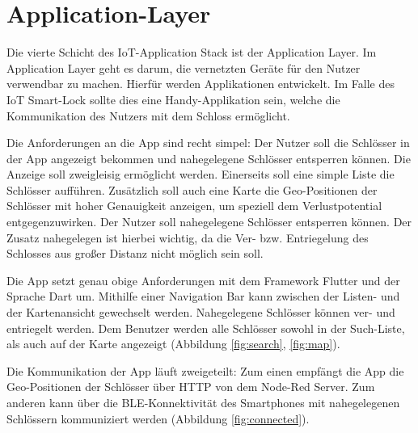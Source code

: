 
\section{Application-Layer}
Die vierte Schicht des \ac{IoT}-Application Stack ist der Application Layer. Im Application Layer geht es darum, die vernetzten Geräte für den Nutzer verwendbar zu machen. Hierfür werden Applikationen entwickelt. Im Falle des \ac{IoT} Smart-Lock sollte dies eine Handy-Applikation sein, welche die Kommunikation des Nutzers mit dem Schloss ermöglicht.

Die Anforderungen an die App sind recht simpel: Der Nutzer soll die Schlösser in der App angezeigt bekommen und nahegelegene Schlösser entsperren können. Die Anzeige soll zweigleisig ermöglicht werden. Einerseits soll eine simple Liste die Schlösser aufführen. Zusätzlich soll auch eine Karte die Geo-Positionen der Schlösser mit hoher Genauigkeit anzeigen, um speziell dem Verlustpotential entgegenzuwirken. Der Nutzer soll nahegelegene Schlösser entsperren können. Der Zusatz nahegelegen ist hierbei wichtig, da die Ver- bzw. Entriegelung des Schlosses aus großer Distanz nicht möglich sein soll.

Die App setzt genau obige Anforderungen mit dem Framework Flutter und der Sprache Dart um. Mithilfe einer Navigation Bar kann zwischen der Listen- und der Kartenansicht gewechselt werden. Nahegelegene Schlösser können ver- und entriegelt werden. Dem Benutzer werden alle Schlösser sowohl in der Such-Liste, als auch auf der Karte angezeigt (Abbildung \ref{fig:search}, \ref{fig:map}).

Die Kommunikation der App läuft zweigeteilt: Zum einen empfängt die App die Geo-Positionen der Schlösser über \ac{HTTP} von dem Node-Red Server. Zum anderen kann über die \ac{BLE}-Konnektivität des Smartphones mit nahegelegenen Schlössern kommuniziert werden (Abbildung \ref{fig:connected}).

